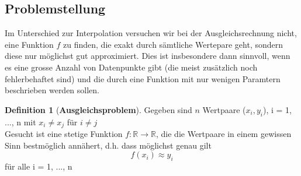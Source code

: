 \documentclass{article}
\theoremstyle{satz}
\theoremstyle{definition}
\newtheorem{definition}{Definition}
\begin{document}
\subsection{Problemstellung}
Im Unterschied zur Interpolation versuchen wir bei der Ausgleichsrechnung nicht, eine Funktion $f$ zu finden, die exakt durch sämtliche Wertepare geht, sondern diese nur möglichst gut approximiert. Dies ist insbesondere dann sinnvoll, wenn es eine grosse Anzahl von Datenpunkte gibt (die meist zusätzlich noch fehlerbehaftet sind) und die durch eine Funktion mit nur wenigen Paramtern beschrieben werden sollen.

\theoremstyle{definition}
\begin{tcolorbox}
\begin{definition}[\textbf{Ausgleichsproblem}]
Gegeben sind $n$ Wertpaare ($x_i, y_i$), i = 1, ..., n mit $x_i \neq x_j$ für $i \neq j$ \\
Gesucht ist eine stetige Funktion $f: \mathbb{R} \rightarrow \mathbb{R}$, die die Wertpaare in einem gewissen Sinn bestmöglich annähert, d.h. dass möglichst genau gilt
\begin{equation}
f(x_i) \approx y_i
\end{equation}
für alle i = 1, ..., n
\end{definition}
\end{tcolorbox}
\end{document}

